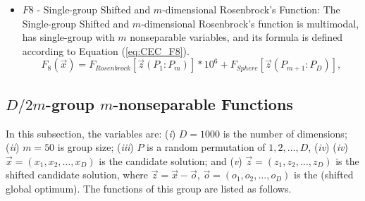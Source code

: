 \begin{itemize}
   \item $F8$ - Single-group Shifted and $m$-dimensional Rosenbrock's Function: The Single-group Shifted and $m$-dimensional Rosenbrock's function is multimodal, has single-group with $m$ nonseparable variables, and its formula is defined according to Equation (\ref{eq:CEC_F8}).
        \begin{equation}\label{eq:CEC_F8}
            F_8(\vec{x}) = F_{Rosenbrock}[\vec{z}(P_1:P_m)] \ast 10^6 + F_{Sphere}[\vec{z}(P_{m+1}:P_D)],
        \end{equation}
 \end{itemize}
     
\subsection{$D/2m$-group $m$-nonseparable Functions}
In this subsection, the variables are: (\emph{i}) $D = 1000$ is the number of dimensions; (\emph{ii}) $m = 50$ is group size; (\emph{iii}) $P$ is a random permutation of ${1, 2, \ldots, D}$, (\emph{iv}) (\emph{iv})$\vec{x} = (x_1, x_2, \ldots, x_D)$ is the candidate solution; and (\emph{v}) $\vec{z} = (z_1, z_2, \ldots, z_D)$ is the shifted candidate solution, where $\vec{z} = \vec{x} - \vec{o}$, $\vec{o} = (o_1, o_2, \ldots, o_D)$ is the (shifted global optimum). The functions of this group are listed as follows.

